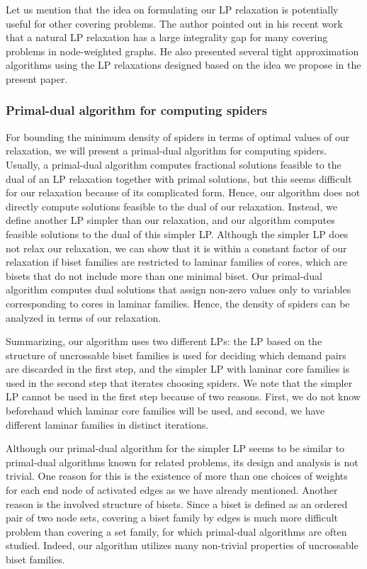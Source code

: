 \documentclass[11pt]{article}
\begin{document}
Let us mention that
the idea on formulating our LP relaxation is potentially useful for other covering problems.
The author pointed out
in his recent work~\cite{Fukunaga14}
that
a natural LP relaxation has a large integrality gap for many covering problems
in node-weighted graphs. He also presented several tight approximation algorithms
using the LP relaxations designed based on the idea we propose in the present paper.


\subsubsection*{Primal-dual algorithm for computing spiders}
For bounding the minimum density of spiders in terms of optimal
values of our relaxation, we will present a primal-dual algorithm for computing
spiders. 
Usually, a primal-dual algorithm computes fractional solutions feasible to
the dual of an LP relaxation together with primal solutions, but this seems
difficult for our relaxation because of its complicated form.
Hence, our algorithm does not directly
compute solutions feasible to the dual of our relaxation.
Instead, we define another LP simpler than our relaxation,
and our algorithm computes feasible solutions to the dual of this
simpler LP.
Although the simpler LP does not relax our relaxation, 
we can show that it is within a constant factor of our relaxation
if biset families are restricted to laminar families of cores, which are
bisets that do not include more than one minimal biset.
Our primal-dual algorithm 
computes dual solutions
that assign non-zero values only to variables corresponding to cores in 
laminar families.
Hence, the density of spiders can be analyzed in terms of our relaxation.

Summarizing, our algorithm uses two different LPs:
the LP based on the structure of uncrossable biset families
is used for deciding which demand pairs are discarded in the first step, and
the simpler LP 
with laminar core families is used
in the second step that iterates choosing spiders.
We note that the simpler LP cannot be used 
in the first step because of two reasons.
First,
we do not know beforehand which laminar core families will be used, and second, we have different laminar families in distinct iterations.

Although
our primal-dual algorithm for the simpler LP 
seems to be similar to primal-dual algorithms known for related
problems, 
its design and analysis is not trivial.
 One reason for this is the
existence of more than one choices of weights for each end node of activated edges as we have already
mentioned. Another reason is the involved structure of bisets. Since a biset is defined as an ordered pair of
two node sets, covering a biset family by edges is much more difficult problem than covering a set family,
for which primal-dual algorithms are often studied. Indeed, our algorithm utilizes many non-trivial
properties of uncrossable biset families.
\end{document}
